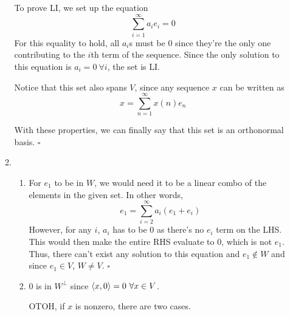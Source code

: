 \documentclass[12pt]{article}
\begin{document}
\begin{enumerate}
\begin{enumerate}
                        To prove LI, we set up the equation
                        \[\sum_{i=1}^{\infty} a_i e_i=0\]
                        For this equality to hold, all $a_i$s must be $0$ since
                        they're the only one contributing to the $i$th term of the sequence.
                        Since the only solution to this equation is $a_i=0\ \forall i$,
                        the set is LI.

                        Notice that this set also spans $V$, since any sequence $x$ can be written as
                        \[x=\sum_{n=1}^{\infty} x(n)e_n\]

                        With these properties, we can finally say that this set is an orthonormal basis. $\square$
                  \item \begin{enumerate}
                              \item For $e_1$ to be in $W$, we would need
                                    it to be a linear combo of the elements in the given set.
                                    In other words,
                                    \[e_1 = \sum_{i=2}^{\infty} a_i(e_1+e_i)\]
                                    However, for any $i$, $a_i$ has to be $0$ as there's no $e_i$ term on the LHS.
                                    This would then make the entire RHS evaluate to $0$, which is not $e_1$.
                                    Thus, there can't exist any solution to this equation and $e_1 \notin W$
                                    and since $e_1 \in V$, $W \ne V$. $\square$
                              \item $0$ is in $W^\perp$ since $\braket{x, 0}=0\ \forall x \in V$.

                                    OTOH, if $x$ is nonzero, there are two cases.


\end{enumerate}
\end{enumerate}
\end{enumerate}
\end{document}
